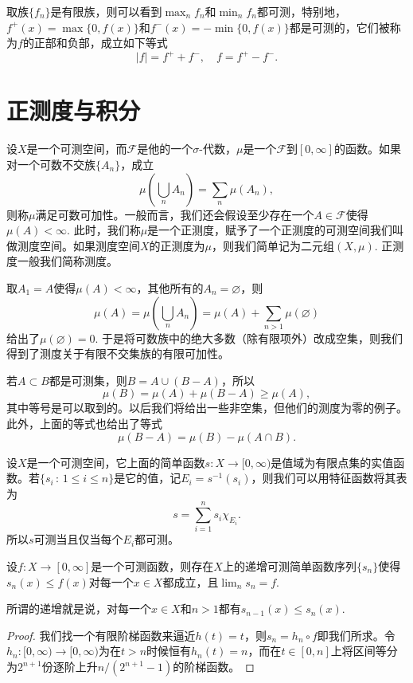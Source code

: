 取族$\{f_n\}$是有限族，则可以看到$\max_n f_n$和$\min_n f_n$都可测，特别地，$f^+(x)=\max\{0,f(x)\}$和$f^-(x)=-\min\{0,f(x)\}$都是可测的，它们被称为$f$的正部和负部，成立如下等式
\[
	|f|=f^++f^-,\quad f=f^+-f^-.
\]

\section{正测度与积分}

\begin{para}
设$X$是一个可测空间，而$\mathcal{F}$是他的一个$\sigma$-代数，$\mu$是一个$\mathcal{F}$到$[0,\infty]$的函数。如果对一个可数不交族$\{A_n\}$，成立
\[
	\mu\left(\bigcup_n A_n\right)=\sum_{n}\mu(A_n),
\]
则称$\mu$满足可数可加性。一般而言，我们还会假设至少存在一个$A\in \mathcal{F}$使得$\mu(A)<\infty$. 此时，我们称$\mu$是一个正测度，赋予了一个正测度的可测空间我们叫做测度空间。如果测度空间$X$的正测度为$\mu$，则我们简单记为二元组$(X,\mu)$. 正测度一般我们简称测度。
\end{para}

取$A_1=A$使得$\mu(A)<\infty$，其他所有的$A_n=\varnothing$，则
\[
	\mu(A)=\mu\left(\bigcup_n A_n\right)=\mu(A)+\sum_{n>1}\mu(\varnothing)
\]
给出了$\mu(\varnothing)=0$. 于是将可数族中的绝大多数（除有限项外）改成空集，则我们得到了测度关于有限不交集族的有限可加性。

若$A\subset B$都是可测集，则$B=A\cup (B-A)$，所以
\[
	\mu(B)=\mu(A)+\mu(B-A)\geq \mu(A),
\]
其中等号是可以取到的。以后我们将给出一些非空集，但他们的测度为零的例子。此外，上面的等式也给出了等式
\[
	\mu(B-A)=\mu(B)-\mu(A\cap B).
\]

\begin{para}
设$X$是一个可测空间，它上面的简单函数$s:X\to [0,\infty)$是值域为有限点集的实值函数。若$\{s_i\,:\,1\leq i\leq n\}$是它的值，记$E_i=s^{-1}(s_i)$，则我们可以用特征函数将其表为
\[
	s=\sum_{i=1}^n s_i \chi_{E_i}.
\]
所以$s$可测当且仅当每个$E_i$都可测。
\end{para}

\begin{pro}
设$f:X\to [0,\infty]$是一个可测函数，则存在$X$上的递增可测简单函数序列$\{s_n\}$使得$s_n(x)\leq f(x)$对每一个$x\in X$都成立，且$\lim_n s_n =f$.
\end{pro}

所谓的递增就是说，对每一个$x\in X$和$n>1$都有$s_{n-1}(x)\leq s_n(x)$.

\begin{proof}
我们找一个有限阶梯函数来逼近$h(t)=t$，则$s_n=h_n\circ f$即我们所求。令$h_n:[0,\infty)\to [0,\infty)$为在$t>n$时候恒有$h_n(t)=n$，而在$t\in [0,n]$上将区间等分为$2^{n+1}$份逐阶上升$n/(2^{n+1}-1)$的阶梯函数。
\end{proof}

